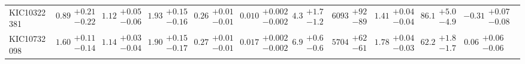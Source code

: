 \begin{tabular}{lccccccccccc}
  KIC10322381 &  $0.89\substack{+0.21 \\ -0.22}$ &  $1.12\substack{+0.05 \\ -0.06}$ &  $1.93\substack{+0.15 \\ -0.16}$ &  $0.26\substack{+0.01 \\ -0.01}$ &  $0.010\substack{+0.002 \\ -0.002}$ &  $4.3\substack{+1.7 \\ -1.2}$ &  $6093\substack{+92 \\ -89}$ &  $1.41\substack{+0.04 \\ -0.04}$ &   $86.1\substack{+5.0 \\ -4.9}$ &          $-0.31\substack{+0.07 \\ -0.08}$ \\
  KIC10732098 &  $1.60\substack{+0.11 \\ -0.14}$ &  $1.14\substack{+0.03 \\ -0.04}$ &  $1.90\substack{+0.15 \\ -0.17}$ &  $0.27\substack{+0.01 \\ -0.01}$ &  $0.017\substack{+0.002 \\ -0.002}$ &  $6.9\substack{+0.6 \\ -0.6}$ &  $5704\substack{+62 \\ -61}$ &  $1.78\substack{+0.04 \\ -0.03}$ &   $62.2\substack{+1.8 \\ -1.7}$ &           $0.06\substack{+0.06 \\ -0.06}$ \\
\bottomrule
\end{tabular}
